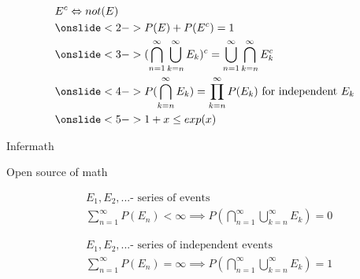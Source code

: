 \documentclass[20pt,xcolor={dvipsnames}]{beamer}
\begin{document}
\begin{frame}

\hspace*{-0.5cm}\vbox{\begin{align*} 
& E^c \Leftrightarrow not(E) \\
& \onslide<2->{P(E)+P(E^c)=1} \\
& \onslide<3->{(\bigcap_{n=1}^{\infty} \bigcup_{k=n}^{\infty} E_k)^c =
\bigcup_{n=1}^{\infty}\bigcap_{k=n}^{\infty} E_k^c}\\
& \onslide<4->{P(\bigcap_{k=n}^{\infty} E_k) = \prod_{k=n}^{\infty} P(E_k) \text{ for independent } E_k} \\
& \onslide<5->{1+x \leq exp(x)} \\
\end{align*}}


\end{frame}

\begin{frame}[c]

\centering


\vspace{-1cm}

\Huge Infermath

\normalsize Open source of math 

\end{frame}

\begin{frame}

\hspace*{-0.5cm}\vbox{\begin{align*} 
& E_1, E_2, ... \text{- series of events} \\
& \sum_{n=1}^{\infty}P(E_n)<\infty \implies P(\bigcap_{n=1}^{\infty} \bigcup_{k=n}^{\infty} E_k)=0
\end{align*}}


\hspace*{-0.5cm}\vbox{\begin{align*} 
& E_1, E_2, ... \text{- series of independent events}\\
& \sum_{n=1}^{\infty}P(E_n)=\infty \implies P(\bigcap_{n=1}^{\infty} \bigcup_{k=n}^{\infty} E_k)=1\\
\end{align*}}

\end{frame}
\end{document}
